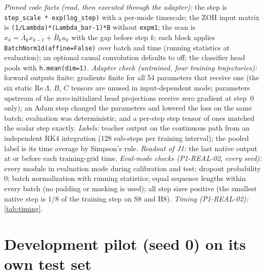 \documentclass{article}
\theoremstyle{plain}
\theoremstyle{definition}
\theoremstyle{remark}
\begin{document}
\emph{Pinned code facts (read, then executed through the adapter):} the step is \texttt{step\_scale * exp(log\_step)} with a per-mode timescale; the ZOH input matrix is \texttt{(1/Lambda)*(Lambda\_bar-1)*B} without \texttt{expm1}; the scan is $x_k=\bar\Lambda_kx_{k-1}+\bar B_ku_k$ with the gap before step $k$; each block applies \texttt{BatchNorm1d(affine=False)} over batch and time (running statistics at evaluation); an optional causal convolution defaults to off; the classifier head pools with \texttt{h.mean(dim=1)}.
\emph{Adapter check (untrained, four training trajectories):} forward outputs finite; gradients finite for all 54 parameters that receive one (the six static $\mathrm{Re}\,\Lambda$, $B$, $C$ tensors are unused in input-dependent mode; parameters upstream of the zero-initialized head projections receive zero gradient at step~0 only); an Adam step changed the parameters and lowered the loss on the same batch; evaluation was deterministic, and a per-step step tensor of ones matched the scalar step exactly.
\emph{Labels:} teacher output on the continuous path from an independent RK4 integration (128 sub-steps per training interval); the pooled label is its time average by Simpson's rule.
\emph{Readout of J1:} the last native output at or before each training-grid time.
\emph{Eval-mode checks (P1-REAL-02, every seed):} every module in evaluation mode during calibration and test; dropout probability 0; batch normalization with running statistics; equal sequence lengths within every batch (no padding or masking is used); all step sizes positive (the smallest native step is $1/8$ of the training step on S8 and H8).
\emph{Timing (P1-REAL-02):} \cref{tab:timing}.



\FloatBarrier
\section{Development pilot (seed 0) on its own test set}
\label{app:pilot}
\end{document}
